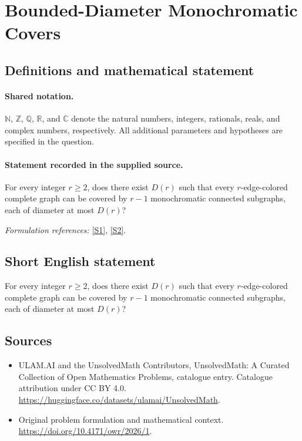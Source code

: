 \documentclass[11pt]{article}
\newcommand{\sref}[2]{\hyperlink{source:#1:#2}{[S#2]}}
\begin{document}
\section{Bounded-Diameter Monochromatic Covers}\label{statement}

\subsection{Definitions and mathematical statement}

\paragraph{Shared notation.}$\mathbb N$, $\mathbb Z$, $\mathbb Q$, $\mathbb R$, and $\mathbb C$ denote the natural numbers, integers, rationals, reals, and complex numbers, respectively. All additional parameters and hypotheses are specified in the question.


\paragraph{Statement recorded in the supplied source.}
For every integer $r\geq2$, does there exist $D(r)$ such that every $r$-edge-colored complete graph can be covered by $r-1$ monochromatic connected subgraphs, each of diameter at most $D(r)$?
\par\smallskip\textit{Formulation references:} \sref{statement}{1}, \sref{statement}{2}.
\subsection{Short English statement}
For every integer $r\geq2$, does there exist $D(r)$ such that every $r$-edge-colored complete graph can be covered by $r-1$ monochromatic connected subgraphs, each of diameter at most $D(r)$?
\subsection{Sources}
\begin{itemize}
\item[\hypertarget{source:statement:1}{S1}] ULAM.AI and the UnsolvedMath Contributors, UnsolvedMath: A Curated Collection of Open Mathematics Problems, catalogue entry. Catalogue attribution under CC BY 4.0.
\url{https://huggingface.co/datasets/ulamai/UnsolvedMath}.
\item[\hypertarget{source:statement:2}{S2}] Original problem formulation and mathematical context.
\url{https://doi.org/10.4171/owr/2026/1}.
\end{itemize}
\label{end:statement}
\end{document}

